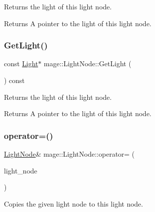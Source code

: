 Returns the light of this light node.

\begin{DoxyReturn}{Returns}
A pointer to the light of this light node. 
\end{DoxyReturn}
\hypertarget{classmage_1_1_light_node_a015453d1751cf3ad78846e972957bb5b}{}\label{classmage_1_1_light_node_a015453d1751cf3ad78846e972957bb5b} 
\subsubsection{\texorpdfstring{Get\+Light()}{GetLight()}\hspace{0.1cm}{\footnotesize\ttfamily [2/2]}}
{\footnotesize\ttfamily const \hyperlink{classmage_1_1_light}{Light}$\ast$ mage\+::\+Light\+Node\+::\+Get\+Light (\begin{DoxyParamCaption}{ }\end{DoxyParamCaption}) const\hspace{0.3cm}{\ttfamily [noexcept]}}

Returns the light of this light node.

\begin{DoxyReturn}{Returns}
A pointer to the light of this light node. 
\end{DoxyReturn}
\hypertarget{classmage_1_1_light_node_a41e3ee25215ccc1cbaed4b73e393930a}{}\label{classmage_1_1_light_node_a41e3ee25215ccc1cbaed4b73e393930a} 
\subsubsection{\texorpdfstring{operator=()}{operator=()}\hspace{0.1cm}{\footnotesize\ttfamily [1/2]}}
{\footnotesize\ttfamily \hyperlink{classmage_1_1_light_node}{Light\+Node}\& mage\+::\+Light\+Node\+::operator= (\begin{DoxyParamCaption}\item[{const \hyperlink{classmage_1_1_light_node}{Light\+Node} \&}]{light\+\_\+node }\end{DoxyParamCaption})\hspace{0.3cm}{\ttfamily [delete]}}

Copies the given light node to this light node.


